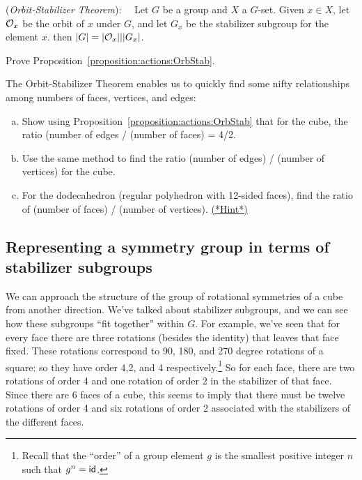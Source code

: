 \begin{prop}\label{proposition:actions:OrbStab}(\emph{Orbit-Stabilizer Theorem}):~~
Let $G$ be a group and $X$ a $G$-set. Given $x\in X$, let ${\cal O}_x$ be the orbit of $x$ under $G$, and let $G_x$ be the stabilizer subgroup for the element $x$. then $|G| = |{\cal O}_x|||G_x|$. 
\end{prop}

\begin{exercise}\label{exercise:actions:proofOrbStab}
Prove Proposition~\ref{proposition:actions:OrbStab}.
\end{exercise}


The Orbit-Stabilizer Theorem enables us to quickly find some nifty relationships among numbers of faces, vertices, and edges:

\begin{exercise}\label{exercise:actions:CubeCounts}
\begin{enumerate}[(a)]
\item
Show using Proposition~\ref{proposition:actions:OrbStab} that for the cube, the ratio (number of edges / (number of  faces) = 4/2. 
\item Use the same method to find the ratio (number of edges) / (number of vertices) for the cube.
\item For the dodecahedron (regular polyhedron with 12-sided faces), find the ratio of (number of faces) / (number of vertices).
\hyperref[sec:actions:hints]{(*Hint*)}
\end{enumerate}
\end{exercise} 

\subsection{Representing a symmetry group in terms of stabilizer subgroups}
We can approach the structure of the group of rotational symmetries of a cube from another direction.  We've talked about stabilizer subgroups, and we can see how these subgroups ``fit together'' within $G$.
For example, we've seen that for every face there are three rotations (besides the identity) that leaves that face fixed. These rotations correspond to 90, 180, and 270 degree rotations of a square: so they have order 4,2, and 4 respectively.\footnote{Recall that the ``order'' of a group element $g$ is the smallest positive integer $n$ such that $g^n = \sf{id}$.} So for each face, there are two rotations of order 4 and one rotation of order 2 in the stabilizer of that face. Since there are 6 faces of a cube, this seems to imply that there must be twelve rotations of order 4 and six rotations of order 2 associated with the stabilizers of the different faces.  

